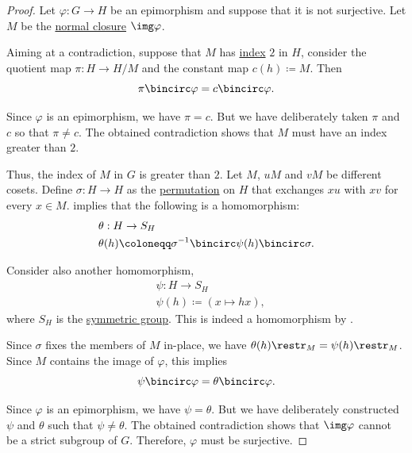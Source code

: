 \begin{proof}
  Let \( \varphi: G \to H \) be an epimorphism and suppose that it is not surjective. Let \( M \) be the \hyperref[def:normal_closure]{normal closure} \( \img \varphi \).

  Aiming at a contradiction, suppose that \( M \) has \hyperref[def:subgroup_index]{index} \( 2 \) in \( H \), consider the quotient map \( \pi: H \to H / M \) and the constant map \( c(h) \coloneqq M \). Then
  \begin{equation*}
    \pi \bincirc \varphi = c \bincirc \varphi.
  \end{equation*}

  Since \( \varphi \) is an epimorphism, we have \( \pi = c \). But we have deliberately taken \( \pi \) and \( c \) so that \( \pi \neq c \). The obtained contradiction shows that \( M \) must have an index greater than \( 2 \).

  Thus, the index of \( M \) in \( G \) is greater than \( 2 \). Let \( M \), \( uM \) and \( vM \) be different cosets. Define \( \sigma: H \to H \) as the \hyperref[def:symmetric_group]{permutation} on \( H \) that exchanges \( xu \) with \( xv \) for every \( x \in M \).  implies that the following is a homomorphism:
  \begin{equation*}
    \begin{aligned}
      &\theta: H \to S_H \\
      &\theta(h) \coloneqq \sigma^{-1} \bincirc \psi(h) \bincirc \sigma.
    \end{aligned}
  \end{equation*}

  Consider also another homomorphism,
  \begin{equation*}
    \begin{aligned}
      &\psi: H \to S_H \\
      &\psi(h) \coloneqq (x \mapsto hx),
    \end{aligned}
  \end{equation*}
  where \( S_H \) is the \hyperref[def:symmetric_group]{symmetric group}. This is indeed a homomorphism by .

  Since \( \sigma \) fixes the members of \( M \) in-place, we have \( \theta(h)\restr_M = \psi(h)\restr_M \). Since \( M \) contains the image of \( \varphi \), this implies
  \begin{equation*}
    \psi \bincirc \varphi = \theta \bincirc \varphi.
  \end{equation*}

  Since \( \varphi \) is an epimorphism, we have \( \psi = \theta \). But we have deliberately constructed \( \psi \) and \( \theta \) such that \( \psi \neq \theta \). The obtained contradiction shows that \( \img \varphi \) cannot be a strict subgroup of \( G \). Therefore, \( \varphi \) must be surjective.
\end{proof}

